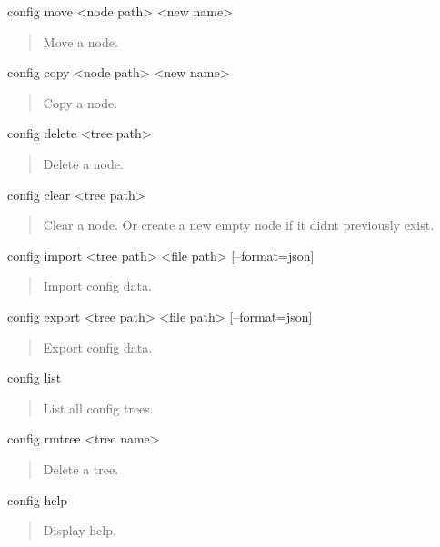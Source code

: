 \begin{DoxyVerb}config move <node path> <new name> \end{DoxyVerb}
 \begin{quote}
Move a node. \end{quote}


\begin{DoxyVerb}config copy <node path> <new name> \end{DoxyVerb}
 \begin{quote}
Copy a node. \end{quote}


\begin{DoxyVerb}config delete <tree path> \end{DoxyVerb}
 \begin{quote}
Delete a node. \end{quote}


\begin{DoxyVerb}config clear <tree path> \end{DoxyVerb}
 \begin{quote}
Clear a node. Or create a new empty node if it didn\textquotesingle{}t previously exist. \end{quote}


\begin{DoxyVerb}config import <tree path> <file path> [--format=json] \end{DoxyVerb}
 \begin{quote}
Import config data. \end{quote}


\begin{DoxyVerb}config export <tree path> <file path> [--format=json] \end{DoxyVerb}
 \begin{quote}
Export config data. \end{quote}


\begin{DoxyVerb}config list \end{DoxyVerb}
 \begin{quote}
List all config trees. \end{quote}


\begin{DoxyVerb}config rmtree <tree name> \end{DoxyVerb}
 \begin{quote}
Delete a tree. \end{quote}


\begin{DoxyVerb}config help \end{DoxyVerb}
 \begin{quote}
Display help. \end{quote}


